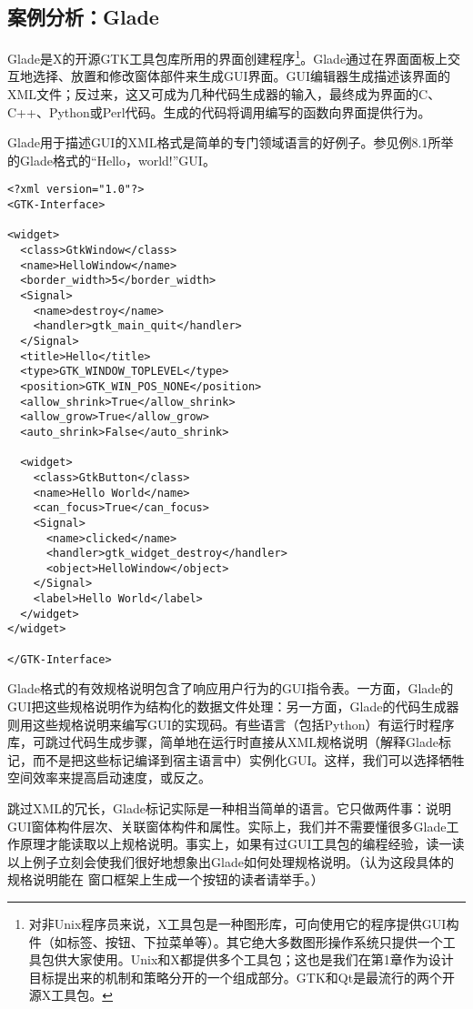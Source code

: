 \documentclass[12pt,oneside]{ctexbook}
\begin{document}
\begin{common-format}
\subsection{案例分析：Glade}
Glade是X的开源GTK工具包库所用的界面创建程序\footnote{对非Unix程序员来说，X工具包是一种图形库，可向使用它的程序提供GUI构件（如标签、按钮、下拉菜单等）。其它绝大多数图形操作系统只提供一个工具包供大家使用。Unix和X都提供多个工具包；这也是我们在第1章作为设计目标提出来的机制和策略分开的一个组成部分。GTK和Qt是最流行的两个开源X工具包。}。Glade通过在界面面板上交互地选择、放置和修改窗体部件来生成GUI界面。GUI编辑器生成描述该界面的XML文件；反过来，这又可成为几种代码生成器的输入，最终成为界面的C、C++、Python或Perl代码。生成的代码将调用编写的函数向界面提供行为。

Glade用于描述GUI的XML格式是简单的专门领域语言的好例子。参见例8.1所举的Glade格式的“Hello，world!”GUI。
\begin{Verbatim}[label=例 8.1 Glade "Hello， World"]
<?xml version="1.0"?>
<GTK-Interface>

<widget>
  <class>GtkWindow</class>
  <name>HelloWindow</name>
  <border_width>5</border_width>
  <Signal>
    <name>destroy</name>
    <handler>gtk_main_quit</handler>
  </Signal>
  <title>Hello</title>
  <type>GTK_WINDOW_TOPLEVEL</type>
  <position>GTK_WIN_POS_NONE</position>
  <allow_shrink>True</allow_shrink>
  <allow_grow>True</allow_grow>
  <auto_shrink>False</auto_shrink>

  <widget>
    <class>GtkButton</class>
    <name>Hello World</name>
    <can_focus>True</can_focus>
    <Signal>
      <name>clicked</name>
      <handler>gtk_widget_destroy</handler>
      <object>HelloWindow</object>
    </Signal>
    <label>Hello World</label>
  </widget>
</widget>

</GTK-Interface>
\end{Verbatim}

Glade格式的有效规格说明包含了响应用户行为的GUI指令表。一方面，Glade的GUI把这些规格说明作为结构化的数据文件处理：另一方面，Glade的代码生成器则用这些规格说明来编写GUI的实现码。有些语言（包括Python）有运行时程序库，可跳过代码生成步骤，简单地在运行时直接从XML规格说明（解释Glade标记，而不是把这些标记编译到宿主语言中）实例化GUI。这样，我们可以选择牺牲空间效率来提高启动速度，或反之。

跳过XML的冗长，Glade标记实际是一种相当简单的语言。它只做两件事：说明GUI窗体构件层次、关联窗体构件和属性。实际上，我们并不需要懂很多Glade工作原理才能读取以上规格说明。事实上，如果有过GUI工具包的编程经验，读一读以上例子立刻会使我们很好地想象出Glade如何处理规格说明。（认为这段具体的规格说明能在
窗口框架上生成一个按钮的读者请举手。）


\end{common-format}
\end{document}

